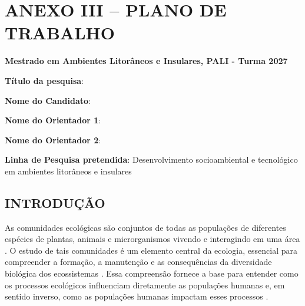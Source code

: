 \documentclass[
	12pt,				%
	oneside,			%
	a4paper,			%
	chapter=TITLE,		%
	section=TITLE,		%
	subsection=TITLE,	%
	subsubsection=TITLE,%
	english,			%
	french,				%
	spanish,			%
	brazilian,				%
	]{abntex2}
\begin{document}
\frenchspacing 


\textual

\chapter*{ANEXO III -- PLANO DE TRABALHO}
\setcounter{chapter}{1}

\begin{center}
\textbf{Mestrado em Ambientes Litorâneos e Insulares, PALI - Turma 2027}
\end{center}

\noindent \textbf{Título da pesquisa}: \imprimirtitulo

\noindent \textbf{Nome do Candidato}: \imprimirautor

\noindent \textbf{Nome do Orientador 1}: \imprimirorientador

\noindent \textbf{Nome do Orientador 2}: \imprimircoorientador

\noindent \textbf{Linha de Pesquisa pretendida}: Desenvolvimento socioambiental e tecnológico em ambientes litorâneos e insulares

\section{INTRODUÇÃO}

As comunidades ecológicas são conjuntos de todas as populações de diferentes espécies de plantas, animais e microrganismos vivendo e interagindo em uma área \cite{miller_ciencia_2021}. 
O estudo de tais comunidades é um elemento central da ecologia, essencial para compreender a formação, a manutenção e as consequências da diversidade biológica dos ecossistemas \cite{morin_community_2011}. 
Essa compreensão fornece a base para entender como os processos ecológicos influenciam diretamente as populações humanas e, em sentido inverso, como as populações humanas impactam esses processos \cite{morin_community_2011}.
\end{document}
